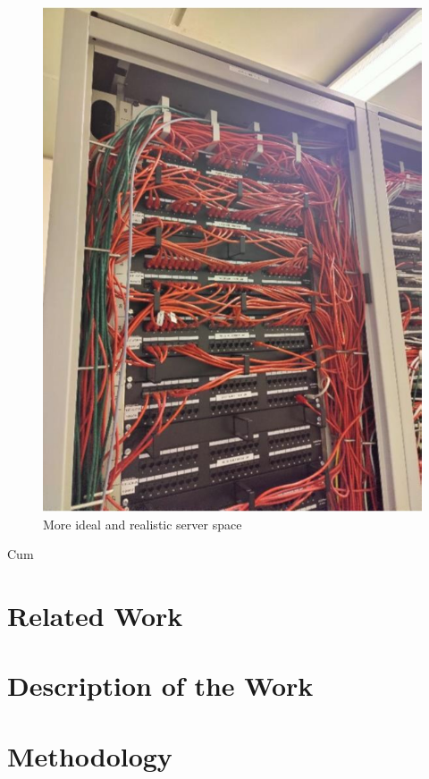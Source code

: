 \documentclass [12pt,letterpaper]{article}
\begin{document}
\begin{figure}
\begin{minipage}{.48\linewidth}
    \includegraphics[width=\linewidth]{images/server_racks_clean.jpg}
    \caption{More ideal and realistic server space}
    \label{img2}
\end{minipage}
\end{figure}

Cum


\section{Related Work}

\section{Description of the Work}

\section{Methodology}
\end{document}
